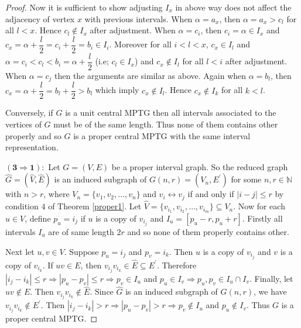 \documentclass{article}
\theoremstyle{definition}
\numberwithin{equation}{section}
\begin{document}
\begin{proof}
\noindent Now it is sufficient to show adjusting $I_{x}$ in above way does not affect the adjacency
of vertex $x$ with previous intervals. When $\alpha=a_{x}$, then $\alpha=a_{x}>c_{l}$ for all $l<x$. Hence $c_{l}\notin I_{x}$ after adjustment. When $\alpha=c_{i}$, then $c_{i}=\alpha\in I_{x}$ and $c_{x}=\alpha+\dfrac{l}{2}=c_{i}+\dfrac{l}{2}=b_{i}\in I_{i}$. Moreover for all $i<l<x$, $c_{x}\in I_{l}$ and $\alpha=c_{i}<c_{l}<b_{i}=\alpha+\dfrac{l}{2}$ (i.e; $c_{l}\in I_{x}$) and $c_{x}\notin I_{l}$ for all $l<i$ after adjustment. When $\alpha=c_{j}$ then the arguments are similar as above.
Again when $\alpha=b_{l}$, then $c_{x}=\alpha+\dfrac{l}{2}=b_{l}+\dfrac{l}{2}>b_{l}$ which imply $c_{x}\notin I_{l}$. Hence $c_{x}\notin I_{k}$ for all $k<l$.

\vspace{.5em}\noindent
Conversely, if $G$ is a unit central MPTG then all intervals associated to the vertices of $G$ must be of the same length. Thus none of them contains other properly and so $G$ is a proper central MPTG with the same interval representation.

\vspace{.3em}
\noindent
$\mathbf{(3\Rightarrow 1):}$ Let $G=(V,E)$ be a proper interval graph. So the reduced graph $\hat{G}=(\hat{V},\hat{E})$ is an induced subgraph of $G(n,r)=(V_{n},E^{'})$ for some $n,r\in\mathbb{N}$ with $n>r$, where $V_{n}=\{v_{1},v_{2},\hdots,v_{n}\}$ and $v_{i}\leftrightarrow v_{j}$ if and only if 
$|i-j|\leq r$ by condition $4$ of Theorem \ref{proper1}. Let $\hat{V}=\{v_{i_{1}},v_{i_{2}},\hdots,v_{i_{m}}\}\subseteq V_{n}$. Now for each $u\in V$, define $p_{u}=i_{j}$ if $u$ is a copy of $v_{i_{j}}$ and $I_{u}=[p_{u}-r,p_{u}+r]$. Firstly all intervals $I_{u}$ are of same length $2r$ and so none of them properly contains other.

\noindent Next let $u,v\in V$. Suppose $p_{u}=i_{j}$ and $p_{v}=i_{k}$. Then $u$ is a copy of $v_{i_{j}}$ and $v$ is a copy of $v_{i_{k}}$. If $uv\in E$, then $v_{i_{j}}v_{i_{k}}\in \hat{E}\subseteq E^{'}$. Therefore $|i_{j}-i_{k}|\leq r \Rightarrow |p_{u}-p_{v}|\leq r \Rightarrow p_{v} \in I_{u}$ and $p_{u}\in I_{v} \Rightarrow p_{u},p_{v}\in I_{u}\cap I_{v}$. Finally, let $uv\notin E$. Then $v_{i_{j}}v_{i_{k}}\notin \hat{E}$. Since $\hat{G}$ is an induced subgraph of $G(n,r)$, we have $v_{i_{j}}v_{i_{k}}\notin E^{'}$. Then $|i_{j}-i_{k}|>r \Rightarrow |p_{u}-p_{v}|>r \Rightarrow p_{v}\notin I_{u}$ and $p_{u}\notin I_{v}$. Thus $G$ is a proper central MPTG.

\vspace{.3em}


\end{proof}
\end{document}
